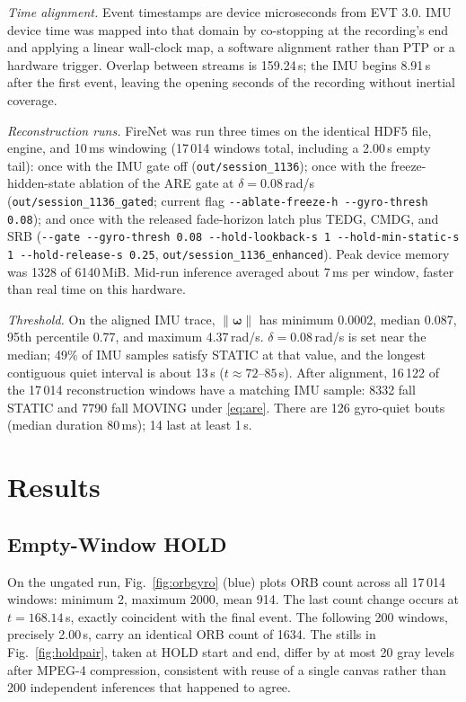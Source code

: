 \documentclass[journal]{IEEEtran}
\DeclareRobustCommand{\norm}[1]{\lVert #1 \rVert}
\begin{document}
\textit{Time alignment.} Event timestamps are device microseconds from EVT 3.0.
IMU device time was mapped into that domain by co-stopping at the recording's
end and applying a linear wall-clock map, a software alignment rather than PTP
or a hardware trigger. Overlap between streams is 159.24\,s; the IMU begins
8.91\,s after the first event, leaving the opening seconds of the recording
without inertial coverage.

\textit{Reconstruction runs.} FireNet was run three times on the identical HDF5
file, engine, and 10\,ms windowing (17\,014 windows total, including a 2.00\,s
empty tail): once with the IMU gate off (\texttt{out/session\_1136}); once with
the freeze-hidden-state ablation of the ARE gate at \(\delta = 0.08\)\,rad/s
(\texttt{out/session\_1136\_gated}; current flag
\texttt{-{}-ablate-freeze-h -{}-gyro-thresh 0.08}); and
once with the released fade-horizon latch plus TEDG, CMDG, and SRB
(\texttt{-{}-gate -{}-gyro-thresh 0.08 -{}-hold-lookback-s 1 -{}-hold-min-static-s 1 -{}-hold-release-s 0.25},
\texttt{out/session\_1136\_enhanced}). Peak device memory was 1328 of 6140\,MiB.
Mid-run inference averaged about 7\,ms per window, faster than real time on this
hardware.

\textit{Threshold.} On the aligned IMU trace, \(\norm{\boldsymbol{\omega}}\) has
minimum 0.0002, median 0.087, 95th percentile 0.77, and maximum 4.37\,rad/s.
\(\delta = 0.08\)\,rad/s is set near the median; 49\% of IMU samples satisfy
STATIC at that value, and the longest contiguous quiet interval is about 13\,s
(\(t \approx 72\)--\(85\)\,s). After alignment, 16\,122 of the 17\,014
reconstruction windows have a matching IMU sample: 8332 fall STATIC and 7790
fall MOVING under \eqref{eq:are}. There are 126 gyro-quiet bouts (median
duration 80\,ms); 14 last at least 1\,s.

\section{Results}
\label{sec:results}

\subsection{Empty-Window HOLD}
On the ungated run, Fig.~\ref{fig:orbgyro} (blue) plots ORB count across all
17\,014 windows: minimum 2, maximum 2000, mean 914. The last count change occurs
at \(t = 168.14\)\,s, exactly coincident with the final event. The following 200
windows, precisely 2.00\,s, carry an identical ORB count of 1634. The stills in
Fig.~\ref{fig:holdpair}, taken at HOLD start and end, differ by at most 20 gray
levels after MPEG-4 compression, consistent with reuse of a single canvas rather
than 200 independent inferences that happened to agree.
\end{document}
